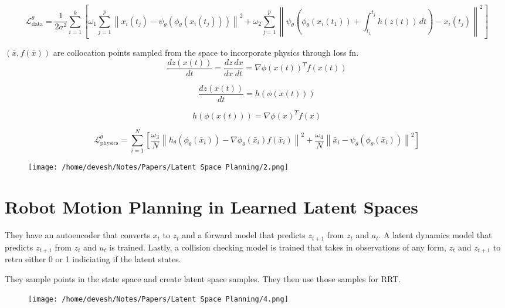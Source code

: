 \documentclass[12pt]{article}
\begin{document}
\[
\mathcal{L}_{\text{data}}^{\theta} = \frac{1}{2\sigma^2} \sum_{i=1}^{k} \left[ \omega_1 \sum_{j=1}^{p} \left\| x_i(t_j) - \psi_{\theta} (\phi_{\theta} (x_i(t_j))) \right\|^2 + \omega_2 \sum_{j=1}^{p} \left\| \psi_{\theta} \left( \phi_{\theta} (x_i(t_1)) + \int_{t_1}^{t_j} h(z(t)) \, dt \right) - x_i(t_j) \right\|^2 \right]
\]

\begin{multicols}{2}
\((\bar{x}, f(\bar{x}))\) are collocation points sampled from the space to incorporate physics through loss fn. 
\[
\frac{d z(x(t))}{d t} = \frac{d z}{d x} \frac{d x}{d t} = \nabla \phi(x(t))^T f(x(t))
\]

\[
\frac{d z(x(t))}{d t} = h(\phi(x(t)))
\]

\[
h(\phi(x(t))) = \nabla \phi(x)^T f(x)
\]
\end{multicols}

\[
\mathcal{L}_{\text{physics}}^{\theta} = \sum_{i=1}^{N} \left[ \frac{\omega_3}{N} \left\| h_{\theta} (\phi_{\theta} (\bar{x}_i)) - \nabla \phi_{\theta} (\bar{x}_i) f(\bar{x}_i) \right\|^2 + \frac{\omega_4}{N} \left\| \bar{x}_i - \psi_{\theta} (\phi_{\theta} (\bar{x}_i)) \right\|^2 \right]
\]
\begin{figure}[ht]
    \centering
    \texttt{[image: /home/devesh/Notes/Papers/Latent Space Planning/2.png]}
    \caption{}
    \label{fig:pinode}
\end{figure}

\newpage
\section{Robot Motion Planning in Learned Latent Spaces}
They have an autoencoder that converts \(x_{t}\) to \(z_{t}\) and a forward model that predicts \(z_{t+1}\) from \(z_{t}\) and \(a_{t}\). A latent dynamics model that predicts \(z_{t+1}\) from \(z_{t}\) and \(u_{t}\) is trained. Lastly, a collision checking model is trained that takes in observations of any form, \(z_{t}\) and \(z_{t+1}\) to retrn either 0 or 1 indiciating if the latent states.

They sample points in the state space and create latent space samples. They then use those samples for RRT. 

\begin{figure}[ht]
    \centering
    \texttt{[image: /home/devesh/Notes/Papers/Latent Space Planning/4.png]}
    \caption{}
    \label{}
\end{figure}
\end{document}
